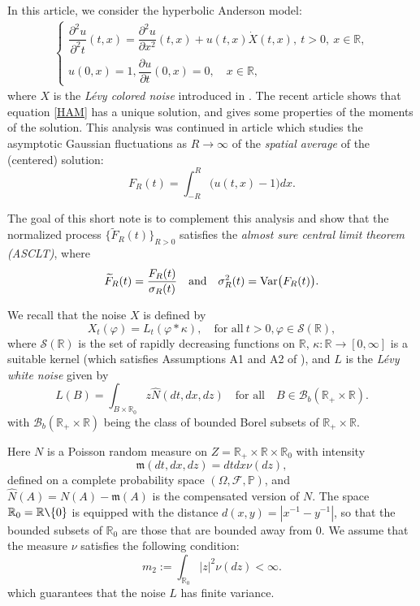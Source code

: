\documentclass[12pt]{article}
\def\cB{\mathcal{B}}
\def\cF{\mathcal{F}}
\def\cS{\mathcal{S}}
\def\bP{\mathbb{P}}
\def\bR{\mathbb{R}}
\def\k{\kappa}
\newcommand{\fm}{\mathfrak{m}}
\begin{document}
In this article, we consider the hyperbolic Anderson model:
\begin{align}
\label{HAM}
	\begin{cases}
		\dfrac{\partial^2 u}{\partial^2 t} (t,x)
		=  \dfrac{\partial^2 u}{\partial x^2} (t,x)+u(t,x) \dot{X}(t,x), \
		t>0, \ x \in \bR, \\
		u(0,x) = 1, \dfrac{\partial u}{\partial t} (0,x)=0, \quad x \in \bR,
	\end{cases}
\end{align}
where $X$ is the {\em L\'evy colored noise} introduced in \cite{B15}. 
The recent article \cite{BJ25} shows that equation \eqref{HAM} has a unique solution, and gives some properties of the moments of the solution. This analysis was continued in article \cite{BS26} which studies the asymptotic Gaussian fluctuations as $R \to \infty$ of the {\em spatial average} of the (centered) solution:
\begin{equation}
\label{def-F}
F_R(t)=\int_{-R}^R \big( u(t,x)-1\big)dx.
\end{equation}
 
The goal of this short note is to complement this analysis and show that the normalized process $\{\widetilde{F}_R(t)\}_{R>0}$ satisfies the {\em almost sure central limit theorem (ASCLT)}, where
\begin{equation}
\label{def-Ft}
\widetilde{F}_R(t)=\frac{F_R(t)}{\sigma_R(t)} \quad \mbox{and} \quad
\sigma_{R}^2(t)={\rm Var}\big(F_R(t)\big).
\end{equation}


We recall that the noise $X$ is defined by
\[
X_t(\varphi)=L_t(\varphi *\k), \quad \mbox{for all} \ t>0,\varphi \in \cS(\bR),
\]
where $\cS(\bR)$ is the set of rapidly decreasing functions on $\bR$, $\k:\bR \to [0,\infty]$ is a suitable kernel (which satisfies Assumptions A1 and A2 of \cite{BJ25}), and $L$ is the {\em L\'evy white noise} given by
\[
L(B)=\int_{B \times \bR_0} z \widehat{N}(dt,dx,dz) \quad \mbox{for all} \quad B \in \cB_b(\bR_+ \times \bR).
\]
with $\cB_b(\bR_+ \times \bR)$ being the class of bounded Borel subsets of $\bR_{+}\times \bR$.

Here $N$ is a Poisson random measure on $Z=\bR_{+}\times \bR \times \bR_0$ with intensity 
\[
\fm(dt,dx,dz)=dt dx \nu(dz),
\] 
defined on a complete probability space $(\Omega,\cF,\bP)$, and  $\widehat{N}(A)=N(A)-\fm(A)$ is the compensated version of $N$.
The space $\bR_0=\bR \verb2\2 \{0\}$ is equipped with the distance $d(x,y)=|x^{-1}-y^{-1}|$, so that the bounded subsets of $\bR_0$ are those that are bounded away from 0.
We assume that the measure $\nu$ satisfies the following condition:
\[
m_2:=\int_{\bR_0}|z|^2 \nu(dz)<\infty.
\]
which guarantees that the noise $L$ has finite variance.
\end{document}

